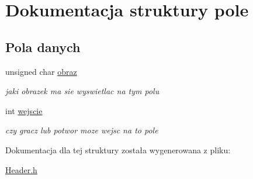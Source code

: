 \hypertarget{structpole}{}\section{Dokumentacja struktury pole}
\label{structpole}
\subsection*{Pola danych}
\begin{DoxyCompactItemize}
\item 
\mbox{\label{structpole_ac5a141ec94fac3a44a74a1029f3c7ff2}} 
unsigned char \mbox{\hyperlink{structpole_ac5a141ec94fac3a44a74a1029f3c7ff2}{obraz}}
\begin{DoxyCompactList}\small\item\em jaki obrazek ma sie wyswietlac na tym polu \end{DoxyCompactList}\item 
\mbox{\label{structpole_ad65ed606d9f4985b6701375b2ecf835a}} 
int \mbox{\hyperlink{structpole_ad65ed606d9f4985b6701375b2ecf835a}{wejscie}}
\begin{DoxyCompactList}\small\item\em czy gracz lub potwor moze wejsc na to pole \end{DoxyCompactList}\end{DoxyCompactItemize}


Dokumentacja dla tej struktury została wygenerowana z pliku\+:\begin{DoxyCompactItemize}
\item 
\mbox{\hyperlink{_header_8h}{Header.\+h}}\end{DoxyCompactItemize}
